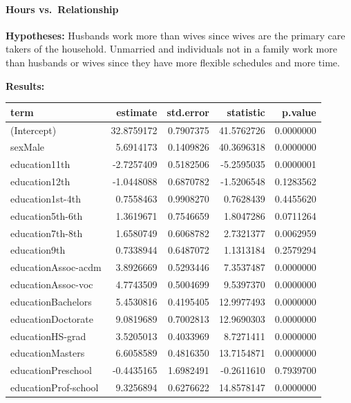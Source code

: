 \documentclass[]{article}
\let\oldparagraph\paragraph
\renewcommand{\paragraph}[1]{\oldparagraph{#1}\mbox{}}
\begin{document}
\hypertarget{hours-vs.relationship}{%
\paragraph{Hours vs.~Relationship}\label{hours-vs.relationship}}

\textbf{Hypotheses:} Husbands work more than wives since wives are the
primary care takers of the household. Unmarried and individuals not in a
family work more than husbands or wives since they have more flexible
schedules and more time.

\textbf{Results:}

\begin{table}[H]
\centering
\begin{tabular}{l|r|r|r|r}
\hline
term & estimate & std.error & statistic & p.value\\
\hline
(Intercept) & 32.8759172 & 0.7907375 & 41.5762726 & 0.0000000\\
\hline
sexMale & 5.6914173 & 0.1409826 & 40.3696318 & 0.0000000\\
\hline
education11th & -2.7257409 & 0.5182506 & -5.2595035 & 0.0000001\\
\hline
education12th & -1.0448088 & 0.6870782 & -1.5206548 & 0.1283562\\
\hline
education1st-4th & 0.7558463 & 0.9908270 & 0.7628439 & 0.4455620\\
\hline
education5th-6th & 1.3619671 & 0.7546659 & 1.8047286 & 0.0711264\\
\hline
education7th-8th & 1.6580749 & 0.6068782 & 2.7321377 & 0.0062959\\
\hline
education9th & 0.7338944 & 0.6487072 & 1.1313184 & 0.2579294\\
\hline
educationAssoc-acdm & 3.8926669 & 0.5293446 & 7.3537487 & 0.0000000\\
\hline
educationAssoc-voc & 4.7743509 & 0.5004699 & 9.5397370 & 0.0000000\\
\hline
educationBachelors & 5.4530816 & 0.4195405 & 12.9977493 & 0.0000000\\
\hline
educationDoctorate & 9.0819689 & 0.7002813 & 12.9690303 & 0.0000000\\
\hline
educationHS-grad & 3.5205013 & 0.4033969 & 8.7271411 & 0.0000000\\
\hline
educationMasters & 6.6058589 & 0.4816350 & 13.7154871 & 0.0000000\\
\hline
educationPreschool & -0.4435165 & 1.6982491 & -0.2611610 & 0.7939700\\
\hline
educationProf-school & 9.3256894 & 0.6276622 & 14.8578147 & 0.0000000\\

\end{tabular}
\end{table}
\end{document}
